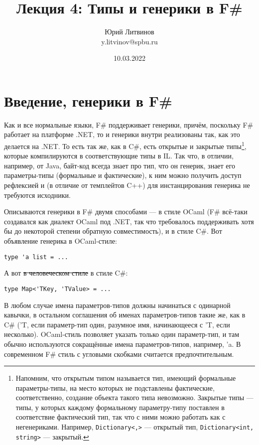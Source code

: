 \documentclass[a5paper]{article}
\title{Лекция 4: Типы и генерики в F\#}
\author{Юрий Литвинов\\\small{y.litvinov@spbu.ru}}
\date{10.03.2022}
\begin{document}
\maketitle
\thispagestyle{empty}

\section{Введение, генерики в F\#}

Как и все нормальные языки, F\# поддерживает генерики, причём, поскольку F\# работает на платформе .NET, то и генерики внутри реализованы так, как это делается на .NET. То есть так же, как в C\#, есть открытые и закрытые типы\footnote{Напомним, что открытым типом называется тип, имеющий формальные параметры-типы, на место которых не подставлены фактические, соответственно, создание объекта такого типа невозможно. Закрытые типы --- типы, у которых каждому формальному параметру-типу поставлен в соответствие фактический тип, так что с ними можно работать как с негенериками. Например, \texttt{Dictionary<,>} --- открытый тип, \texttt{Dictionary<int, string>} --- закрытый.}, которые компилируются в соответствующие типы в IL. Так что, в отличии, например, от Java, байт-код всегда знает про тип, что он генерик, знает его параметры-типы (формальные и фактические), к ним можно получить доступ рефлексией и (в отличие от темплейтов C++) для инстанцирования генерика не требуются исходники.

Описываются генерики в F\# двумя способами --- в стиле OCaml (F\# всё-таки создавался как диалект OCaml под .NET, так что требовалось поддерживать хотя бы до некоторой степени обратную совместимость), и в стиле C\#. Вот объявление генерика в OCaml-стиле:

\begin{verbatim}
type 'a list = ...
\end{verbatim}

А вот \sout{в человеческом стиле} в стиле C\#:

\begin{verbatim}
type Map<'TKey, 'TValue> = ...
\end{verbatim}

В любом случае имена параметров-типов должны начинаться с одинарной кавычки, в остальном соглашения об именах параметров-типов такие же, как в C\# ('T, если параметр-тип один, разумное имя, начинающееся с 'T, если несколько). OCaml-стиль позволяет указать только один параметр-тип, и там обычно используются сокращённые имена параметров-типов, например, 'a. В современном F\# стиль с угловыми скобками считается предпочтительным.
\end{document}
